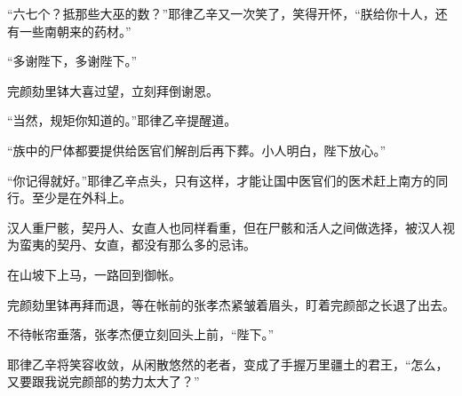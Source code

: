 “六七个？抵那些大巫的数？”耶律乙辛又一次笑了，笑得开怀，“朕给你十人，还有一些南朝来的药材。”

“多谢陛下，多谢陛下。”

完颜劾里钵大喜过望，立刻拜倒谢恩。

“当然，规矩你知道的。”耶律乙辛提醒道。

“族中的尸体都要提供给医官们解剖后再下葬。小人明白，陛下放心。”

“你记得就好。”耶律乙辛点头，只有这样，才能让国中医官们的医术赶上南方的同行。至少是在外科上。

汉人重尸骸，契丹人、女直人也同样看重，但在尸骸和活人之间做选择，被汉人视为蛮夷的契丹、女直，都没有那么多的忌讳。

在山坡下上马，一路回到御帐。

完颜劾里钵再拜而退，等在帐前的张孝杰紧皱着眉头，盯着完颜部之长退了出去。

不待帐帘垂落，张孝杰便立刻回头上前，“陛下。”

耶律乙辛将笑容收敛，从闲散悠然的老者，变成了手握万里疆土的君王，“怎么，又要跟我说完颜部的势力太大了？”

